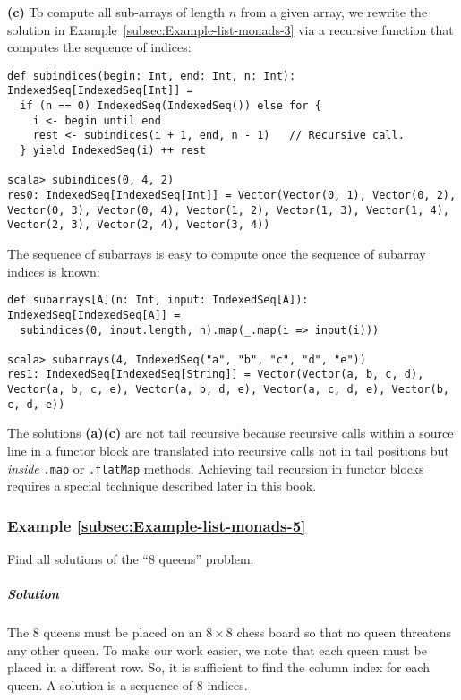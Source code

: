 \textbf{(c)} To compute all sub-arrays of length $n$ from a given
array, we rewrite the solution in Example~\ref{subsec:Example-list-monads-3}
via a recursive function that computes the sequence of indices:
\begin{lstlisting}
def subindices(begin: Int, end: Int, n: Int): IndexedSeq[IndexedSeq[Int]] =
  if (n == 0) IndexedSeq(IndexedSeq()) else for {
    i <- begin until end
    rest <- subindices(i + 1, end, n - 1)   // Recursive call.
  } yield IndexedSeq(i) ++ rest

scala> subindices(0, 4, 2)
res0: IndexedSeq[IndexedSeq[Int]] = Vector(Vector(0, 1), Vector(0, 2), Vector(0, 3), Vector(0, 4), Vector(1, 2), Vector(1, 3), Vector(1, 4), Vector(2, 3), Vector(2, 4), Vector(3, 4))
\end{lstlisting}
The sequence of subarrays is easy to compute once the sequence of
subarray indices is known: 
\begin{lstlisting}
def subarrays[A](n: Int, input: IndexedSeq[A]): IndexedSeq[IndexedSeq[A]] =
  subindices(0, input.length, n).map(_.map(i => input(i)))

scala> subarrays(4, IndexedSeq("a", "b", "c", "d", "e"))
res1: IndexedSeq[IndexedSeq[String]] = Vector(Vector(a, b, c, d), Vector(a, b, c, e), Vector(a, b, d, e), Vector(a, c, d, e), Vector(b, c, d, e))
\end{lstlisting}

The solutions \textbf{(a)}\textendash \textbf{(c)} are not tail recursive
because recursive calls within a source line in a functor block are
translated into recursive calls not in tail positions but \emph{inside}
\lstinline!.map! or \lstinline!.flatMap! methods. Achieving tail
recursion in functor blocks requires a special technique described
later in this book.

\subsubsection{Example \label{subsec:Example-list-monads-5}\ref{subsec:Example-list-monads-5}}

Find all solutions of the ``$8$ queens'' problem.

\subparagraph{Solution}

The $8$ queens must be placed on an $8\times8$ chess board so that
no queen threatens any other queen. To make our work easier, we note
that each queen must be placed in a different row. So, it is sufficient
to find the column index for each queen. A solution is a sequence
of $8$ indices.

